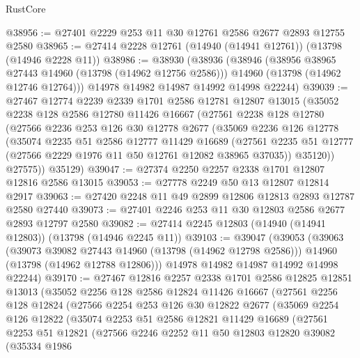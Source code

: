 \begin{lexlean}{RustCore}
\begin{coremodule}
@38956 := @27401 @2229 @253 @11 @30 @12761 @2586 @2677 @2893 @12755 @2580
@38965 := @27414 @2228 @12761 (@14940 (@14941 @12761)) (@13798 (@14946 @2228 @11))
@38986 := @38930
    (@38936
      (@38946
        (@38956 @38965 @27443 @14960 (@13798 (@14962 @12756 @2586)))
        @14960
        (@13798 (@14962 @12746 @12764)))
      @14978
      @14982
      @14987
      @14992
      @14998
      @22244)
@39039 := @27467
    @12774
    @2239
    @2339
    @1701
    @2586
    @12781
    @12807
    @13015
    (@35052
      @2238
      @128
      @2586
      @12780
      @11426
      @16667
      (@27561
        @2238
        @128
        @12780
        (@27566
          @2236
          @253
          @126
          @30
          @12778
          @2677
          (@35069
            @2236
            @126
            @12778
            (@35074
              @2235
              @51
              @2586
              @12777
              @11429
              @16689
              (@27561 @2235 @51 @12777 (@27566 @2229 @1976 @11 @50 @12761 @12082 @38965 @37035))
              @35120))
          @27575))
      @35129)
@39047 := @27374 @2250 @2257 @2338 @1701 @12807 @12816 @2586 @13015
@39053 := @27778 @2249 @50 @13 @12807 @12814 @2917
@39063 := @27420 @2248 @11 @49 @2899 @12806 @12813 @2893 @12787 @2580 @27440
@39073 := @27401 @2246 @253 @11 @30 @12803 @2586 @2677 @2893 @12797 @2580
@39082 := @27414 @2245 @12803 (@14940 (@14941 @12803)) (@13798 (@14946 @2245 @11))
@39103 := @39047
    (@39053
      (@39063
        (@39073 @39082 @27443 @14960 (@13798 (@14962 @12798 @2586)))
        @14960
        (@13798 (@14962 @12788 @12806)))
      @14978
      @14982
      @14987
      @14992
      @14998
      @22244)
@39170 := @27467
    @12816
    @2257
    @2338
    @1701
    @2586
    @12825
    @12851
    @13013
    (@35052
      @2256
      @128
      @2586
      @12824
      @11426
      @16667
      (@27561
        @2256
        @128
        @12824
        (@27566
          @2254
          @253
          @126
          @30
          @12822
          @2677
          (@35069
            @2254
            @126
            @12822
            (@35074
              @2253
              @51
              @2586
              @12821
              @11429
              @16689
              (@27561
                @2253
                @51
                @12821
                (@27566
                  @2246
                  @2252
                  @11
                  @50
                  @12803
                  @12820
                  @39082
                  (@35334
                    @1986

\end{coremodule}
\end{lexlean}
